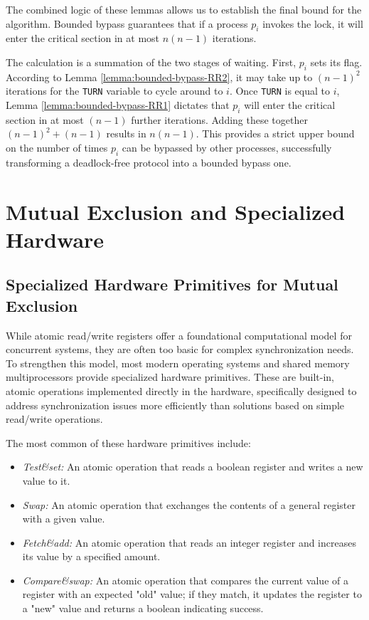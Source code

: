 The combined logic of these lemmas allows us to establish the final bound for the algorithm. Bounded bypass guarantees that if a process $p_i$ invokes the lock, it will enter the critical section in at most $n(n-1)$ iterations.

The calculation is a summation of the two stages of waiting. First, $p_i$ sets its flag. According to Lemma \ref{lemma:bounded-bypass-RR2}, it may take up to $(n-1)^2$ iterations for the \texttt{TURN} variable to cycle around to $i$. Once \texttt{TURN} is equal to $i$, Lemma \ref{lemma:bounded-bypass-RR1} dictates that $p_i$ will enter the critical section in at most $(n-1)$ further iterations. Adding these together $(n-1)^2+(n-1)$ results in $n(n-1)$. This provides a strict upper bound on the number of times $p_i$ can be bypassed by other processes, successfully transforming a deadlock-free protocol into a bounded bypass one.

\section{Mutual Exclusion and Specialized Hardware}
\subsection{Specialized Hardware Primitives for Mutual Exclusion}
While atomic read/write registers offer a foundational computational model for concurrent systems, they are often too basic for complex synchronization needs. To strengthen this model, most modern operating systems and shared memory multiprocessors provide specialized hardware primitives. These are built-in, atomic operations implemented directly in the hardware, specifically designed to address synchronization issues more efficiently than solutions based on simple read/write operations.

The most common of these hardware primitives include:
\begin{itemize}
    \item \textit{Test\&set:} An atomic operation that reads a boolean register and writes a new value to it.
    \item \textit{Swap:} An atomic operation that exchanges the contents of a general register with a given value.
    \item \textit{Fetch\&add:} An atomic operation that reads an integer register and increases its value by a specified amount.
    \item \textit{Compare\&swap:} An atomic operation that compares the current value of a register with an expected "old" value; if they match, it updates the register to a "new" value and returns a boolean indicating success.
\end{itemize}

